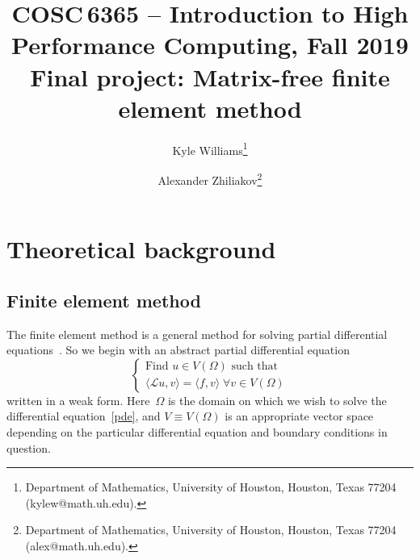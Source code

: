 \documentclass[12pt]{article}
\title{COSC\,6365 -- Introduction to High Performance Computing, Fall 2019\\Final project: \textbf{Matrix-free finite element method}}
\author{
	Kyle Williams\thanks{Department of Mathematics, University of Houston, Houston, Texas 77204 (kylew@math.uh.edu).} \and
	Alexander Zhiliakov\thanks{Department of Mathematics, University of Houston, Houston, Texas 77204 (alex@math.uh.edu).}
}
\begin{document}
	
\maketitle

\tableofcontents
\vfill
\clearpage
\let\oldtabular\tabular
\renewcommand{\tabular}[1][1.5]{\def\arraystretch{#1}\oldtabular}
\renewcommand\arraystretch{1.3}

\section{Theoretical background}

\subsection{Finite element method}\label{sec:fem}
The finite element method is a general method for solving partial differential equations~\cite{smth}. So we begin with an abstract partial differential equation
\begin{equation}\label{pde}
\begin{cases} 
	\text{Find } u \in V(\Omega) \text{ such that } \\
	\langle \mathcal{L}u, v \rangle = \langle f, v \rangle \; \forall v \in V(\Omega)
\end{cases}
\end{equation}
written in a weak form. Here~$\Omega$ is the domain on which we wish to solve the differential equation~\eqref{pde}, and $V \equiv V(\Omega)$ is an appropriate vector space depending on the particular differential equation and boundary conditions in question. 
\end{document}
